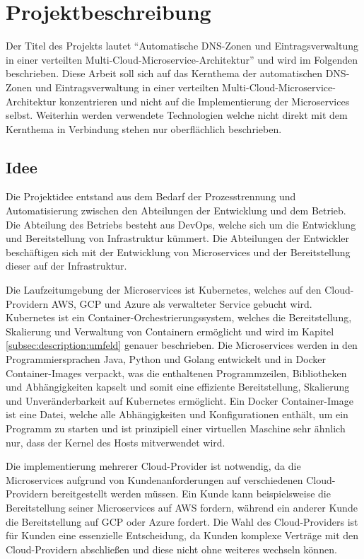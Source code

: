 \chapter{Projektbeschreibung}
\label{ch:description}
Der Titel des Projekts lautet \enquote{Automatische DNS-Zonen und Eintragsverwaltung in einer verteilten Multi-Cloud-Microservice-Architektur} und wird im Folgenden beschrieben.
Diese Arbeit soll sich auf das Kernthema der automatischen DNS-Zonen und Eintragsverwaltung in einer verteilten Multi-Cloud-Microservice-Architektur konzentrieren und nicht auf die Implementierung der Microservices selbst.
Weiterhin werden verwendete Technologien welche nicht direkt mit dem Kernthema in Verbindung stehen nur oberflächlich beschrieben.

\section{Idee}
\label{sec:description:projektidee}
Die Projektidee entstand aus dem Bedarf der Prozesstrennung und Automatisierung zwischen den Abteilungen der Entwicklung und dem Betrieb.
Die Abteilung des Betriebs besteht aus \ac{DevOps}, welche sich um die Entwicklung und Bereitstellung von Infrastruktur kümmert.
Die Abteilungen der Entwickler beschäftigen sich mit der Entwicklung von Microservices und der Bereitstellung dieser auf der Infrastruktur.
\medskip

Die Laufzeitumgebung der Microservices ist Kubernetes, welches auf den Cloud-Providern \ac{AWS}, \ac{GCP} und \ac{Azure} als verwalteter Service gebucht wird.
Kubernetes ist ein Container-Orchestrierungssystem, welches die Bereitstellung, Skalierung und Verwaltung von Containern ermöglicht und wird im Kapitel \ref{subsec:description:umfeld} genauer beschrieben.
Die Microservices werden in den Programmiersprachen Java, Python und Golang entwickelt und in Docker
Container-Images verpackt, was die enthaltenen Programmzeilen, Bibliotheken und Abhängigkeiten kapselt und somit eine effiziente Bereitstellung, Skalierung und Unveränderbarkeit auf Kubernetes ermöglicht.
Ein Docker Container-Image ist eine Datei, welche alle Abhängigkeiten und Konfigurationen enthält, um ein Programm zu starten und ist prinzipiell einer virtuellen Maschine sehr ähnlich nur, dass der Kernel des Hosts mitverwendet wird.
\medskip

Die implementierung mehrerer Cloud-Provider ist notwendig, da die Microservices aufgrund von Kundenanforderungen auf verschiedenen Cloud-Providern bereitgestellt werden müssen.
Ein Kunde kann beispielsweise die Bereitstellung seiner Microservices auf AWS fordern, während ein anderer Kunde die Bereitstellung auf GCP oder Azure fordert.
Die Wahl des Cloud-Providers ist für Kunden eine essenzielle Entscheidung, da Kunden komplexe Verträge mit den Cloud-Providern abschließen und diese nicht ohne weiteres wechseln können.
\medskip

